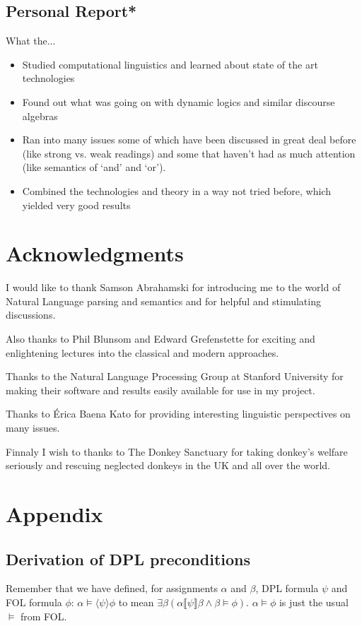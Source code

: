 \documentclass[12pt]{article}
\let\stdsection\section
\renewcommand\section{\newpage\stdsection}
\begin{document}
\subsection{Personal Report*}

What the...

\begin{itemize}
\item Studied computational linguistics and learned about state of the art technologies
\item Found out what was going on with dynamic logics and 
similar discourse algebras
\item Ran into many issues some of which have been discussed in great deal before (like strong vs. weak readings) and some that haven't had as much attention (like semantics of `and' and `or').
\item Combined the technologies and theory in a way not tried before, which yielded very good results
\end{itemize}

\section{Acknowledgments}
I would like to thank Samson Abrahamski for introducing me to the world of Natural Language parsing and semantics and for helpful and stimulating discussions.

Also thanks to Phil Blunsom and Edward Grefenstette for exciting and enlightening lectures into the classical and modern approaches.

Thanks to the Natural Language Processing Group at Stanford University for making their software and results easily available for use in my project\cite{klein2003accurate}.

Thanks to Érica Baena Kato for providing interesting linguistic perspectives on many issues.

Finnaly I wish to thanks to The Donkey Sanctuary\cite{donkey2013sanctuary} for taking donkey's welfare seriously and rescuing neglected donkeys in the UK and all over the world.

\newpage
\section{Appendix}
\subsection{Derivation of DPL preconditions}
Remember that we have defined, for assignments $\alpha$ and $\beta$, DPL formula $\psi$ and FOL formula $\phi$: $\alpha\models\langle\psi\rangle\phi$ to mean $\exists\beta(\alpha\llbracket\psi\rrbracket\beta\wedge\beta\models\phi)$. $\alpha\models\phi$ is just the usual $\models$ from FOL.
\end{document}
